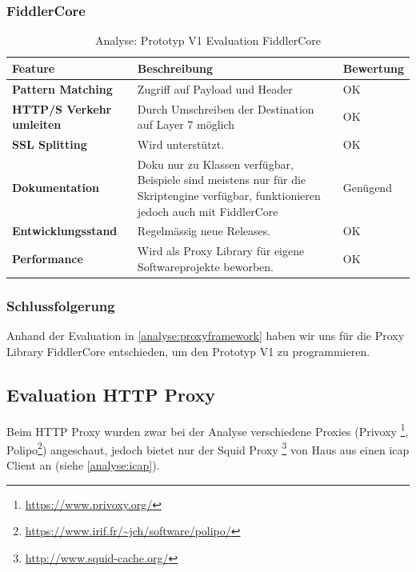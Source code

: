\begin{table}[H]
	\subsubsection{FiddlerCore}
    \centering
	\begin{tabularx}{\textwidth}{| l | X | X |}
        \hline
        \textbf{Feature} & \textbf{Beschreibung} & \textbf{Bewertung} \\ \hline
        \textbf{Pattern Matching} & Zugriff auf Payload und Header & \cellcolor{green!25}OK \\ \hline 
        \textbf{HTTP/S Verkehr umleiten} & Durch Umschreiben der Destination auf Layer 7 möglich  & \cellcolor{green!25}OK \\ \hline 
        \textbf{SSL Splitting} & Wird unterstützt. & \cellcolor{green!25}OK \\ \hline 
        \textbf{Dokumentation} & Doku nur zu Klassen verfügbar, Beispiele sind meistens nur für die Skriptengine verfügbar, funktionieren jedoch auch mit FiddlerCore & \cellcolor{yellow!25}Genügend \\ \hline  
        \textbf{Entwicklungsstand} & Regelmässig neue Releases. & \cellcolor{green!25}OK \\ \hline
        \textbf{Performance} & Wird als Proxy Library für eigene Softwareprojekte beworben. & \cellcolor{green!25}OK \\ \hline       
    \end{tabularx}
    \caption{Analyse: Prototyp V1 Evaluation FiddlerCore}
\end{table}

\subsubsection{Schlussfolgerung}
Anhand der Evaluation in \ref{analyse:proxyframework} haben wir uns für die Proxy Library FiddlerCore entschieden, um den Prototyp V1 zu programmieren.

\subsection{Evaluation HTTP Proxy}

Beim HTTP Proxy wurden zwar bei der Analyse verschiedene Proxies (Privoxy \footnote{\url{https://www.privoxy.org/}}, Polipo\footnote{\url{https://www.irif.fr/~jch/software/polipo/}}) angeschaut, jedoch bietet nur der Squid Proxy \footnote{\url{http://www.squid-cache.org/}} von Haus aus einen \gls{icap} Client an (siehe \ref{analyse:icap}).


